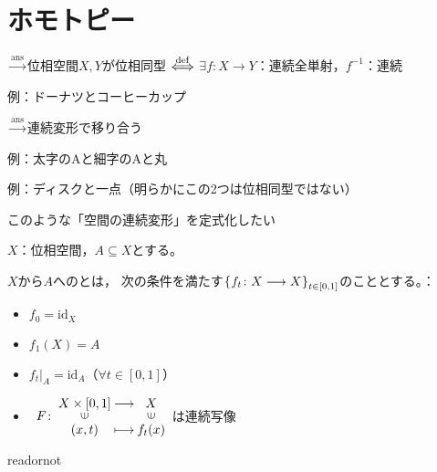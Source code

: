 \documentclass[uplatex]{jsarticle}
\renewcommand{\restriction}[2]{\left. #1 \right|_{#2}}
\begin{document}
\fi

\section{ホモトピー}


$\xrightarrow{\text{ans}}$位相空間$X,Y$が位相同型 $\overset{\mathrm{def}}{\Longleftrightarrow}$ $\exists f \colon X \longrightarrow Y$：連続全単射，$f^{-1}$：連続

例：ドーナツとコーヒーカップ

$\xrightarrow{\text{ans}}$連続変形で移り合う

例：太字のAと細字のAと丸 %

例：ディスクと一点（明らかにこの2つは位相同型ではない）

このような「空間の連続変形」を定式化したい

\sukima {}

$X$：位相空間，$A \subseteq X$とする。

\begin{teigi}[変形レトラクション]
  $X$から$A$へのとは，
  次の条件を満たす$\Set{\hspace{-1.8pt} f_{t} \colon X \longrightarrow X \hspace{-1.8pt}}_{t \in [0,1]}$のこととする。：
  \begin{itemize}
    \vspace{-0.5\baselineskip}
    \item $f_{0} = \mathrm{id}_{X}$
    \item $f_{1}(X) = A$
    \item $\restriction{f_{t}}{A} = \mathrm{id}_{A}$（$\forall t \in [0,1]$）
    \item $\renewcommand{\arraystretch}{0.8} \begin{array}{c@{\:}c@{\:}c@{\:}c}
               & X \times [0,1] & \longrightarrow & X \\
      F \colon & \vin           &                 & \vin \\
               & (x,t)          & \longmapsto     & f_{t}(x)
    \end{array} \renewcommand{\arraystretch}{1.3}$は連続写像
  \end{itemize}
\end{teigi}

\expandafter\ifx\csname readornot\endcsname\relax
  
\end{document}
